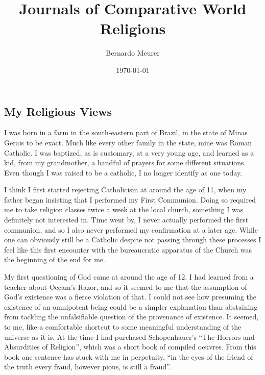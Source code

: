 \documentclass[12pt,letterpaper]{article}
\title{Journals of Comparative World Religions}
\author{Bernardo Meurer}
\date{\today}
\begin{document}
\begin{spacing}{2}
    \maketitle
    \newpage
    \tableofcontents

    \newpage
    \section{My Religious Views}
        I was born in a farm in the south-eastern part of Brazil, in the state
        of Minas Gerais to be exact. Much like every other family in the state,
        mine was Roman Catholic. I was baptized, as is customary, at a very
        young age, and learned as a kid, from my grandmother, a handful of
        prayers for some different situations. Even though I was raised to be a
        catholic, I no longer identify as one today.

        I think I first started rejecting Catholicism at around the age of 11,
        when my father began insisting that I performed my First Communion.
        Doing so required me to take religion classes twice a week at the local
        church, something I was definitely not interested in. Time went by, I
        never actually performed the first communion, and so I also never
        performed my confirmation at a later age. While one can obviously still
        be a Catholic despite not passing through these processes I feel like
        this first encounter with the bureaucratic apparatus of the Church was
        the beginning of the end for me.

        My first questioning of God came at around the age of 12. I had learned
        from a teacher about Occam's Razor, and so it seemed to me that the
        assumption of God's existence was a fierce violation of that. I could
        not see how presuming the existence of an omnipotent being could be a
        simpler explanation than abstaining from tackling the unfalsifiable
        question of the provenance of existence. It seemed, to me, like a
        comfortable shortcut to some meaningful understanding of the universe as
        it is. At the time I had purchased Schopenhauer's ``The Horrors and
        Absurdities of Religion'', which was a short book of compiled oeuvres.
        From this book one sentence has stuck with me in perpetuity, ``in the
        eyes of the friend of the truth every fraud, however pious, is still a
        fraud''.


\end{spacing}
\end{document}
